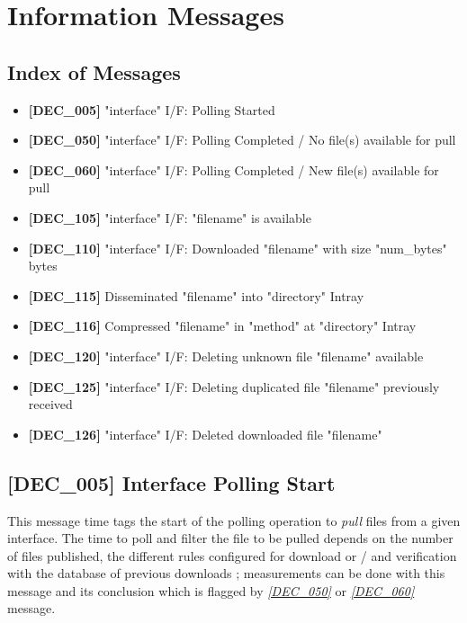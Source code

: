 \documentclass[dec_sum_main.tex]{subfiles}
\begin{document}

\section{Information Messages}

\subsection{Index of Messages}

\begin{itemize}
	\item \textbf{[DEC\_005]} "interface" I/F: Polling Started
	\item \textbf{[DEC\_050]} "interface" I/F: Polling Completed / No file(s) available for pull	
	\item \textbf{[DEC\_060]} "interface" I/F: Polling Completed / New file(s) available for pull
	\item \textbf{[DEC\_105]} "interface" I/F: "filename" is available
	\item \textbf{[DEC\_110]} "interface" I/F: Downloaded "filename" with size "num\_bytes" bytes
	\item \textbf{[DEC\_115]} Disseminated "filename" into "directory" Intray
	\item \textbf{[DEC\_116]} Compressed "filename" in "method" at "directory" Intray
	\item \textbf{[DEC\_120]} "interface" I/F: Deleting unknown file "filename" available
	\item \textbf{[DEC\_125]} "interface" I/F: Deleting duplicated file "filename" previously received 
	\item \textbf{[DEC\_126]} "interface" I/F: Deleted downloaded file "filename"  	
\end{itemize}

\subsection{[DEC\_005] Interface Polling Start}
\label{DEC005}
This message time tags the start of the polling operation to \textit{pull} files from a given interface. The time to poll and filter the file to be pulled depends on the number of files published, the different rules configured for download or / and verification with the database of previous downloads ; measurements can be done with this message and its conclusion which is flagged by \hyperref[DEC050]{\textit{[DEC\_050]}} or \hyperref[DEC060]{\textit{[DEC\_060]}} message.
\end{document}

